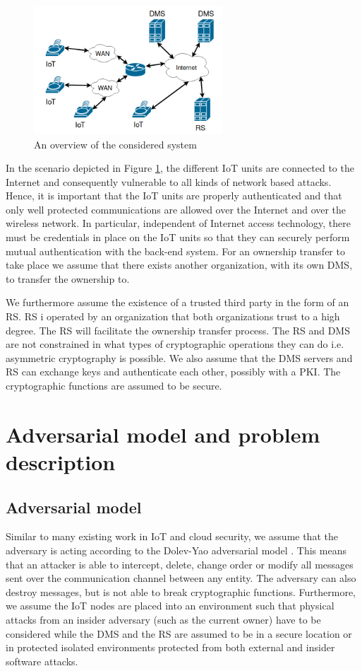 {\begin{figure}
\centering
\includegraphics[width=200pt]{papers/ot/images/ot-fig-1.png}
\caption{An overview of the considered system}
\label{fig:system_0}
\end{figure}

In the scenario depicted in Figure \ref{fig:system_0}, the different IoT units are connected to the Internet and consequently vulnerable to all kinds of network based attacks. Hence, it is important that the IoT units are properly authenticated and that only well protected communications are allowed over the Internet and over the wireless network. In particular, independent of Internet access technology, there must be credentials in place on the IoT units so that they can securely perform mutual authentication with the back-end system. 
For an ownership transfer to take place we assume that there exists another organization, with its own DMS, to transfer the ownership to. 


We furthermore assume the existence of a trusted third party in the form of an RS. RS i operated by an organization that both organizations trust to a high degree. The RS will facilitate the ownership transfer process.
The RS and DMS are not constrained in what types of cryptographic operations they can do i.e. asymmetric cryptography is possible. We also assume that the DMS servers and RS can exchange keys and authenticate each other, possibly with a PKI. The cryptographic functions are assumed to be secure.

\section{Adversarial model and problem description}
\label{sec:ot:threat-model}
\subsection{Adversarial model}
\label{sec:ot:adversary}
Similar to many existing work in IoT and cloud security, we assume that the adversary is acting according to the Dolev-Yao adversarial model \cite{Dolev1981}. This means that an attacker is able to intercept, delete, change order or modify all messages sent over the communication channel between any entity. The adversary can also destroy messages, but is not able to break cryptographic functions. Furthermore, we assume the IoT nodes are placed into an environment such that physical attacks from an insider adversary (such as the current owner) have to be considered while the DMS and the RS are assumed to be in a secure location or in protected isolated environments protected from both external and insider software attacks.

}
